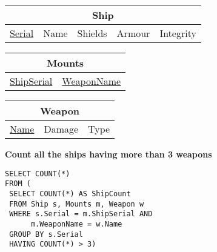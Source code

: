 \documentclass{beamer}
\begin{document}
\begin{frame}[fragile]

\begin{tabular}{|c|c|c|c|c|}
\hline
\multicolumn{5}{|c|}{\textbf{Ship}} \\
\hline
\underline{Serial} & Name & Shields & Armour & Integrity \\
\hline
\end{tabular}

\begin{tabular}{|c|c|}
\hline
\multicolumn{2}{|c|}{\textbf{Mounts}} \\
\hline
\underline{ShipSerial} & \underline{WeaponName} \\
\hline
\end{tabular}

\begin{tabular}{|c|c|c|}
\hline
\multicolumn{3}{|c|}{\textbf{Weapon}} \\
\hline
\underline{Name} & Damage & Type \\
\hline
\end{tabular}

\vspace{0.25cm}
\textbf{Count all the ships having more than 3 weapons}

\pause
\begin{lstlisting}[showstringspaces=false]
SELECT COUNT(*)
FROM (
 SELECT COUNT(*) AS ShipCount
 FROM Ship s, Mounts m, Weapon w
 WHERE s.Serial = m.ShipSerial AND 
      m.WeaponName = w.Name
 GROUP BY s.Serial
 HAVING COUNT(*) > 3)
                   
\end{lstlisting}

\end{frame}
\end{document}
